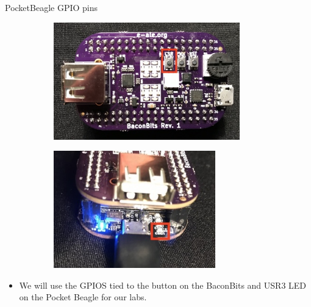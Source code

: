 \begin{frame}
   {PocketBeagle GPIO pins}
   \begin{figure}[H]
      \centering
      \begin{subfigure}{0.4\textwidth}
         \centering
         \includegraphics[height=2in]{IMAGES/baconbits-button}
      \end{subfigure}
      \begin{subfigure}{0.4\textwidth}
         \centering
         \includegraphics[height=2in]{IMAGES/pocketbeagle-usr3-off}
      \end{subfigure}
   \end{figure}
   \begin{itemize}
      \item We will use the GPIOS tied to the button on the BaconBits
              and USR3 LED on the Pocket Beagle for our labs.
   \end{itemize}
\end{frame}

\cprotect\note{

}

